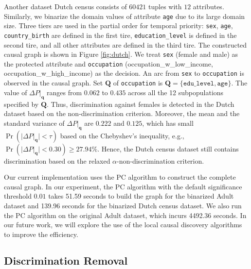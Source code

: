 \documentclass[twoside,leqno,twocolumn]{article}
\begin{document}

Another dataset Dutch census consists of $60421$ tuples with $12$ attributes. Similarly, we binarize the domain values of attribute \texttt{age} due to its large domain size. Three tiers are used in the partial order for temporal priority: \texttt{sex}, \texttt{age}, \texttt{country\_birth} are defined in the first tire, \texttt{education\_level} is defined in the second tire, and all other attributes are defined in the third tire. The constructed causal graph is shown in Figure \ref{fig:dutch}. We treat \texttt{sex} (female and male) as the protected attribute and \texttt{occupation} (occupation\_w\_low\_income, occupation\_w\_high\_income) as the decision. An arc from \texttt{sex} to \texttt{occupation} is observed in the causal graph. Set $\mathbf{Q}$ of \texttt{occupation} is $\mathbf{Q}=\{\texttt{edu\_level},\texttt{age}\}$. The value of $\Delta P|_{\mathbf{q}}$ ranges from $0.062$ to $0.435$ across all the 12 subpopulations specified by $\mathbf{Q}$. Thus, discrimination against females is detected in the Dutch dataset based on the non-discrimination criterion. Moreover, the mean and the standard variance of $\Delta P|_{\mathbf{q}}$ are $0.222$ and $0.125$, which has small $\Pr(|\Delta P|_{\mathbf{q}}| < \tau )$ based on the Chebyshev's inequality, e.g., $\Pr(|\Delta P|_{\mathbf{q}}| < 0.30) \geq 27.94\%$. Hence, the Dutch census dataset still contains discrimination based on the relaxed $\alpha$-non-discrimination criterion.

Our current implementation uses the PC algorithm to construct the complete causal graph. %
In our experiment, the PC algorithm with the default significance threshold $0.01$ takes 51.59 seconds to build the graph for the binarized Adult dataset and 139.96 seconds for the binarized Dutch census dataset. We also run the PC algorithm on the original Adult dataset, which incurs 4492.36 seconds. In our future work, we will explore the use of the local causal discovery algorithms to improve the efficiency.

\subsection{Discrimination Removal}

\setlength{\tabcolsep}{4pt}
\end{document}
